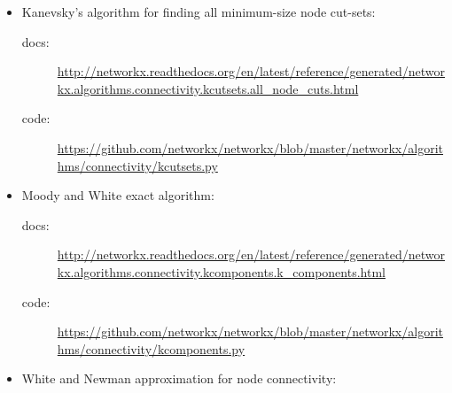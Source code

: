 \begin{itemize}

\item Kanevsky’s algorithm for finding all minimum-size node cut-sets:

\begin{tiny}

\begin{description}

\item[docs:] \href{http://networkx.readthedocs.org/en/latest/reference/generated/networkx.algorithms.connectivity.kcutsets.all_node_cuts.html}{http://networkx.readthedocs.org/en/latest/reference/generated/networkx.algorithms.connectivity.kcutsets.all\_node\_cuts.html}

\item[code:] \href{https://github.com/networkx/networkx/blob/master/networkx/algorithms/connectivity/kcutsets.py}{https://github.com/networkx/networkx/blob/master/networkx/algorithms/connectivity/kcutsets.py}

\end{description}

\end{tiny}

\item Moody and White exact algorithm:

\begin{tiny}

\begin{description}

\item[docs:] \href{http://networkx.readthedocs.org/en/latest/reference/generated/networkx.algorithms.connectivity.kcomponents.k_components.html}{http://networkx.readthedocs.org/en/latest/reference/generated/networkx.algorithms.connectivity.kcomponents.k\_components.html}

\item[code:] \href{https://github.com/networkx/networkx/blob/master/networkx/algorithms/connectivity/kcomponents.py}{https://github.com/networkx/networkx/blob/master/networkx/algorithms/connectivity/kcomponents.py}

\end{description}
\end{tiny}

\item White and Newman approximation for node connectivity:

\begin{tiny}
\begin{description}


\end{description}
\end{tiny}
\end{itemize}
